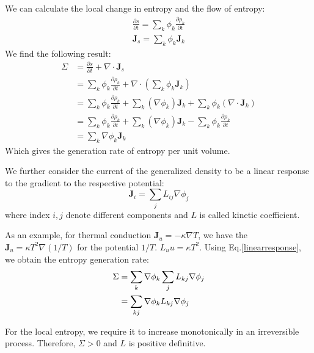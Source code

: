 \documentclass{article}
\newcommand{\pfrac}[2]{\frac{\partial #1}{\partial #2}}
\begin{document}
We can calculate the local change in entropy and the flow of entropy:
\begin{gather}
    \pfrac{s}{t} = \sum_k \phi_k \pfrac{\rho_k}{t} \\
    \mathbf{J}_s = \sum_k \phi_k \mathbf{J}_{k}
\end{gather}
We find the following result:
\begin{align}
    \Sigma &= \pfrac{s}{t} +\nabla \cdot  \mathbf{J}_s \\
    & = \sum_k \phi_k \pfrac{\rho_k}{t} + \nabla \cdot \left(\sum_k \phi_k \mathbf{J}_{k} \right)\\
    & = \sum_k \phi_k \pfrac{\rho_k}{t} + \sum_k (\nabla  \phi_k) \mathbf{J}_{k} + \sum_k \phi_k (\nabla \cdot \mathbf{J}_{k}) \\
    & = \sum_k \phi_k \pfrac{\rho_k}{t} + \sum_k (\nabla  \phi_k) \mathbf{J}_{k} - \sum_k \phi_k \pfrac{\rho_k}{t} \\
    & = \sum_k \nabla \phi_k \mathbf{J}_{k}
\end{align}
Which gives the generation rate of entropy per unit volume.

We further consider the current of the generalized density to be a linear response to the 
gradient to the respective potential:
\begin{equation}
    \mathbf{J}_i = \sum_j L_{ij} \nabla \phi_j \label{linearresponse}
\end{equation}
where index $i,j$ denote different components and $L$ is called kinetic coefficient. 

As an example, for thermal conduction $\mathbf{J}_u = - \kappa \nabla T$, we have 
the $\mathbf{J}_u = \kappa T^2 \nabla (1/T)$ for the potential $1/T$. $L_uu = \kappa T^2$.
Using Eq.\ref{linearresponse}, we obtain the entropy generation rate:
\begin{align}
    \Sigma &= \sum_k \nabla \phi_k \sum_j L_{kj} \nabla \phi_j \notag \\
        & = \sum_{kj} \nabla \phi_k L_{kj} \nabla \phi_j
\end{align}

For the local entropy, we require it to increase monotonically in an irreversible process. Therefore,
$\Sigma > 0$ and $L$ is positive definitive.
\end{document}
